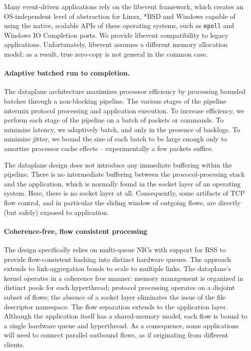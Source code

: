 Many event-driven applications rely on the libevent framework, which
creates an OS-independent level of abstraction for Linux, *BSD and
Windows capable of using the native, scalable APIs of these operating
systems, such as \texttt{epoll} and Windows IO Completion ports.  We
provide libevent compatibility to legacy applications. Unfortunately,
libevent assumes a different memory allocation model; as a result,
true zero-copy is not general in the common case.


\paragraph{Adaptive batched run to completion.}

The dataplane architecture maximizes processor efficiency by
processing bounded batches through a non-blocking pipeline.  The
various stages of the pipeline intermix protocol processing and
application execution.  To increase efficiency, we perform each stage
of the pipeline on a batch of packets or commands.  To minimize
latency, we adaptively batch, and only in the presence of backlogs.
To minimize jitter, we bound the size of each batch to be large enough
only to amortize processor cache effects -- experimentally a few
packets suffice.

The dataplane design does not introduce any immediate buffering within
the pipeline.  There is no intermediate buffering between the
prococol-procesing stack and the application, which is normally found
in the socket layer of an operating system. Here, there is no socket
layer at all.  Consequently, some artifacts of TCP flow control, and
in particular the sliding window of outgoing flows, are directly (but
safely) exposed to application.

\paragraph{Coherence-free, flow consistent processing}

The design specifically relies on multi-queue NICs with support for
RSS to provide flow-consistent hashing into distinct hardware queues.
The approach extends to link-aggregation bonds to scale to multiple
links.  The dataplane's kernel operates in a coherence free manner:
memory management is organized in distinct pools for each hyperthread;
protocol processing operates on a disjoint subset of flows; the
absence of a socket layer eliminates the issue of the file descriptor
namespace.  The flow separation extends to the application layer.
Although the application itself has a shared-memory model, each flow
is bound to a single hardware queue and hyperthread.  As a
consequence, some applications will need to connect parallel outbound
flows, as if originating from different clients.

